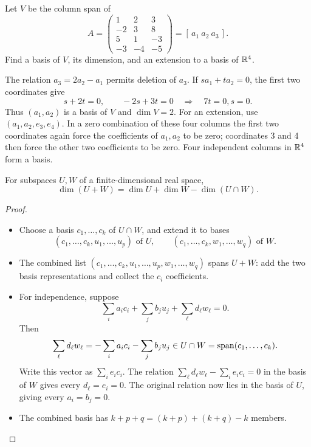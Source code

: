 \begin{example}\label{example:03:extend}
Let \(V\) be the column span of
\[
A=\begin{pmatrix}1&2&3\\-2&3&8\\5&1&-3\\-3&-4&-5\end{pmatrix}
=[\,a_1\ a_2\ a_3\,].
\]
Find a basis of \(V\), its dimension, and an extension to a basis of \(\mathbb R^4\).

The relation \(a_3=2a_2-a_1\) permits deletion of \(a_3\).
If \(sa_1+ta_2=0\), the first two coordinates give
\[
s+2t=0,\qquad -2s+3t=0\quad\Longrightarrow\quad 7t=0, s=0.
\]
Thus \((a_1,a_2)\) is a basis of \(V\) and \(\dim V=2\).
For an extension, use \((a_1,a_2,e_3,e_4)\).
In a zero combination of these four columns the first two coordinates
again force the coefficients of \(a_1,a_2\) to be zero;
coordinates 3 and 4 then force the other two coefficients to be zero.
Four independent columns in \(\mathbb R^4\) form a basis.
\end{example}

\begin{theorem}\label{thm:03:sum}
For subspaces \(U,W\) of a finite-dimensional real space,
\[
\boxed{\dim(U+W)=\dim U+\dim W-\dim(U\cap W).}
\]
\end{theorem}
\begin{proof}
\begin{itemize}
\item Choose a basis \(c_1,\ldots,c_k\) of \(U\cap W\), and extend it to bases
\[
(c_1,\ldots,c_k,u_1,\ldots,u_p)\text{ of }U,\qquad
(c_1,\ldots,c_k,w_1,\ldots,w_q)\text{ of }W.
\]
\item The combined list \((c_1,\ldots,c_k,u_1,\ldots,u_p,w_1,\ldots,w_q)\)
spans \(U+W\): add the two basis representations and collect the \(c_i\) coefficients.
\item For independence, suppose
\[
\sum_i a_ic_i+\sum_j b_ju_j+\sum_\ell d_\ell w_\ell=0.
\]
Then
\[
\sum_\ell d_\ell w_\ell=-\sum_i a_ic_i-\sum_j b_ju_j
\in U\cap W=\operatorname{span}(c_1,\ldots,c_k).
\]
Write this vector as \(\sum_i e_ic_i\). The relation
\(\sum_\ell d_\ell w_\ell-\sum_i e_ic_i=0\) in the basis of \(W\)
gives every \(d_\ell=e_i=0\). The original relation now lies in the
basis of \(U\), giving every \(a_i=b_j=0\).
\item The combined basis has \(k+p+q=(k+p)+(k+q)-k\) members.
\end{itemize}
\end{proof}

